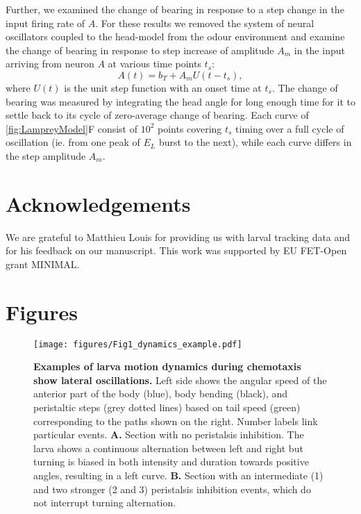 \documentclass[11pt,a4paper]{article}
\begin{document}
Further, we examined the change of bearing in response to a step change in the input firing rate of $A$.
 For these results we removed the system of neural oscillators coupled to the head-model from the odour environment and examine the change of bearing in response to step increase of amplitude $A_m$ in the input arriving from neuron $A$ at various time points $t_s$:
\begin{equation}
A(t) = b_T + A_m U(t-t_s),
\end{equation}
where $U(t)$ is the unit step function with an onset time at $t_s$. The change of bearing was measured by integrating the head angle for long enough time for it to settle back to its cycle of zero-average change of bearing. Each curve of \ref{fig:LampreyModel}F consist of $10^2$ points covering $t_s$ timing over a full cycle of oscillation (ie. from one peak of $E_L$ burst to the next), while each curve differs in the step amplitude $A_m$.


\section{Acknowledgements}
We are grateful to Matthieu Louis for providing us with larval tracking data and for his feedback on our manuscript. This work was supported by EU FET-Open grant MINIMAL.

\newpage
\section{Figures}


\begin{figure}
\begin{center}
\texttt{[image: figures/Fig1\_dynamics\_example.pdf]}
\caption{{\bf Examples of larva motion dynamics during chemotaxis show lateral oscillations.} 
Left side shows the angular speed of the anterior part of the body (blue), body bending (black), and peristaltic steps (grey dotted lines) based on tail speed (green) corresponding to the paths shown on the right. Number labels link particular events. 
{\bf A.} Section with no peristalsis inhibition. The larva shows a continuous alternation between left and right but turning is biased in both intensity and duration towards positive angles, resulting in a left curve.
{\bf B.} Section with an intermediate (1) and two stronger (2 and 3) peristalsis inhibition events, which do not interrupt turning alternation.
\label{fig:DynamicsExample}
}
\end{center}
\end{figure}
\end{document}
